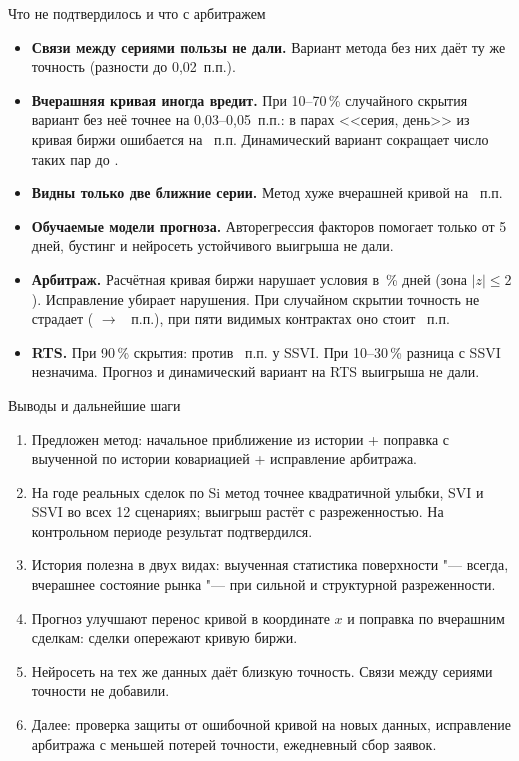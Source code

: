 \documentclass[aspectratio=169]{beamer}
\begin{document}
\begin{frame}{Что не подтвердилось и что с арбитражем}
    \small
    \begin{itemize}
        \item \textbf{Связи между сериями пользы не дали.} Вариант метода без них даёт ту же точность (разности до 0{,}02~п.п.).
        \item \textbf{Вчерашняя кривая иногда вредит.} При 10--70\,\% случайного скрытия вариант без неё точнее на 0{,}03--0{,}05~п.п.: в  парах <<серия, день>> из  кривая биржи ошибается на ~п.п. Динамический вариант сокращает число таких пар до .
        \item \textbf{Видны только две ближние серии.} Метод хуже вчерашней кривой на ~п.п.
        \item \textbf{Обучаемые модели прогноза.} Авторегрессия факторов помогает только от 5 дней, бустинг и нейросеть устойчивого выигрыша не дали.
        \item \textbf{Арбитраж.} Расчётная кривая биржи нарушает условия в \,\% дней (зона $|z|\le 2$). Исправление убирает нарушения. При случайном скрытии точность не страдает ( $\rightarrow$ ~п.п.), при пяти видимых контрактах оно стоит ~п.п.
        \item \textbf{RTS.} При 90\,\% скрытия:  против ~п.п. у SSVI. При 10--30\,\% разница с SSVI незначима. Прогноз и динамический вариант на RTS выигрыша не дали.
    \end{itemize}
\end{frame}

\begin{frame}{Выводы и дальнейшие шаги}
    \begin{enumerate}[1)]
        \item Предложен метод: начальное приближение из истории + поправка с выученной по истории ковариацией + исправление арбитража.
        \item На годе реальных сделок по Si метод точнее квадратичной улыбки, SVI и SSVI во всех 12 сценариях; выигрыш растёт с разреженностью. На контрольном периоде результат подтвердился.
        \item История полезна в двух видах: выученная статистика поверхности "--- всегда, вчерашнее состояние рынка "--- при сильной и структурной разреженности.
        \item Прогноз улучшают перенос кривой в координате $x$ и поправка по вчерашним сделкам: сделки опережают кривую биржи.
        \item Нейросеть на тех же данных даёт близкую точность. Связи между сериями точности не добавили.
        \item Далее: проверка защиты от ошибочной кривой на новых данных, исправление арбитража с меньшей потерей точности, ежедневный сбор заявок.
    \end{enumerate}
\end{frame}
\end{document}
